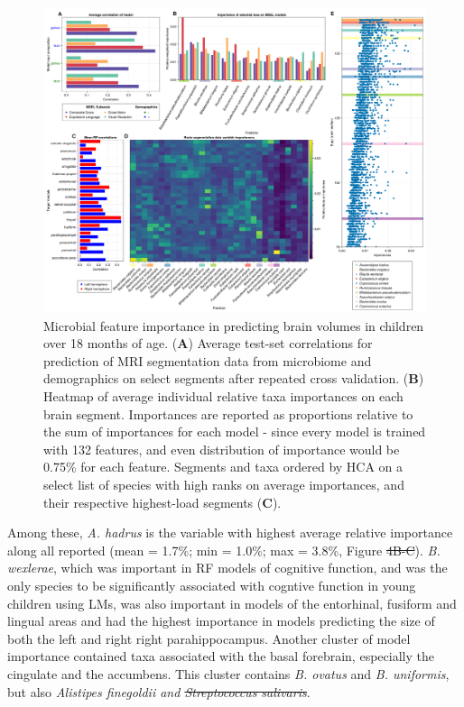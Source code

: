 \documentclass{article}
\providecommand{\DIFadd}[1]{{\protect\color{blue}\uwave{#1}}} %
\providecommand{\DIFdel}[1]{{\protect\color{red}\sout{#1}}}                      %
\providecommand{\DIFaddbegin}{} %
\providecommand{\DIFaddend}{} %
\providecommand{\DIFdelbegin}{} %
\providecommand{\DIFdelend}{} %
\newcommand{\DIFscaledelfig}{0.5}
\newlength{\DIFdelgraphicswidth} %
\newlength{\DIFdelgraphicsheight} %
\newcommand{\DIFaddincludegraphics}[2][]{{\color{blue}\fbox{\DIFOincludegraphics[#1]{#2}}}} %
\newcommand{\DIFdelincludegraphics}[2][]{%
\sbox{\DIFdelgraphicsbox}{\DIFOincludegraphics[#1]{#2}}%
\settoboxwidth{\DIFdelgraphicswidth}{\DIFdelgraphicsbox} %
\settoboxtotalheight{\DIFdelgraphicsheight}{\DIFdelgraphicsbox} %
\scalebox{\DIFscaledelfig}{%
\parbox[b]{\DIFdelgraphicswidth}{\usebox{\DIFdelgraphicsbox}\\[-\baselineskip] \rule{\DIFdelgraphicswidth}{0em}}\llap{\resizebox{\DIFdelgraphicswidth}{\DIFdelgraphicsheight}{%
\setlength{\unitlength}{\DIFdelgraphicswidth}%
\begin{picture}(1,1)%
\thicklines\linethickness{2pt} %
{\color[rgb]{1,0,0}\put(0,0){\framebox(1,1){}}}%
{\color[rgb]{1,0,0}\put(0,0){\line( 1,1){1}}}%
{\color[rgb]{1,0,0}\put(0,1){\line(1,-1){1}}}%
\end{picture}%
}\hspace*{3pt}}} %
} %
\DeclareRobustCommand{\DIFaddbegin}{\DIFOaddbegin \let\includegraphics\DIFaddincludegraphics} %
\DeclareRobustCommand{\DIFaddend}{\DIFOaddend \let\includegraphics\DIFOincludegraphics} %
\DeclareRobustCommand{\DIFdelbegin}{\DIFOdelbegin \let\includegraphics\DIFdelincludegraphics} %
\DeclareRobustCommand{\DIFdelend}{\DIFOaddend \let\includegraphics\DIFOincludegraphics} %
\begin{document}
\begin{figure}
    \centering
    \includegraphics[width=\textwidth]{assets/Figure4.png}
    \caption{
        Microbial feature importance in predicting brain volumes in children over 18 months of age.
        (\textbf{A}) Average test-set correlations for prediction of MRI segmentation
        data from microbiome and demographics on select segments after repeated
        cross validation. (\textbf{B}) Heatmap of average individual relative taxa
        importances on each brain segment. Importances are reported as
        proportions relative to the sum of importances for each model - since
        every model is trained with 132 features, and even distribution of
        importance would be 0.75\% for each feature. Segments and taxa ordered
        by HCA on a select list of species with high ranks on average importances,
        and their respective highest-load segments (\textbf{C}).
    }
    \label{fig:4}
\end{figure}

Among these, \emph{A. hadrus} is the variable with 
highest average relative importance along all reported 
(mean = 1.7\%; min = 1.0\%; max = 3.8\%, Figure \DIFdelbegin \DIFdel{4B-C}\DIFdelend \DIFaddbegin \DIFadd{4D-E}\DIFaddend ).
\emph{B. wexlerae}, which was important in RF models of cognitive function,
and was the only species to be significantly associated
with cogntive function in young children using LMs, 
was also important in models of the entorhinal, fusiform and lingual areas
and had the highest importance in models predicting the size of
both the left and right right parahippocampus.
Another cluster of model importance contained taxa associated with the
basal forebrain, especially the cingulate and the accumbens. This
cluster contains \emph{B. ovatus} and \emph{B. uniformis},
but also \emph{Alistipes finegoldii and \DIFdelbegin \DIFdel{Streptococcus salivaris}\DIFdelend \DIFaddbegin \DIFadd{S. salivarius}\DIFaddend }.
\end{document}
